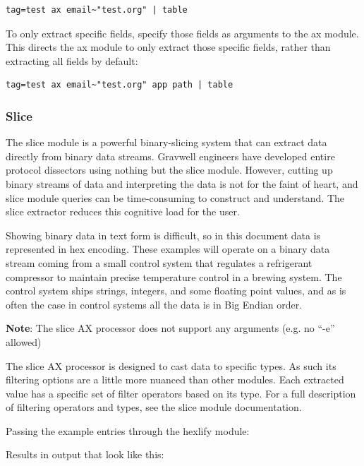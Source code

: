\begin{Verbatim}[breaklines=true]
tag=test ax email~"test.org" | table
\end{Verbatim}

To only extract specific fields, specify those fields as arguments to
the ax module. This directs the ax module to only extract those specific
fields, rather than extracting all fields by default:

\begin{Verbatim}[breaklines=true]
tag=test ax email~"test.org" app path | table
\end{Verbatim}

\subsubsection{Slice}

The slice module is a powerful binary-slicing system that can extract
data directly from binary data streams. Gravwell engineers have
developed entire protocol dissectors using nothing but the slice module.
However, cutting up binary streams of data and interpreting the data is
not for the faint of heart, and slice module queries can be
time-consuming to construct and understand. The slice extractor reduces
this cognitive load for the user.

Showing binary data in text form is difficult, so in this document data
is represented in hex encoding. These examples will operate on a binary
data stream coming from a small control system that regulates a
refrigerant compressor to maintain precise temperature control in a
brewing system. The control system ships strings, integers, and some
floating point values, and as is often the case in control systems all
the data is in Big Endian order.

\textbf{Note}: The slice AX processor does not support any arguments (e.g. no
``-e'' allowed)

The slice AX processor is designed to cast data to specific types. As
such its filtering options are a little more nuanced than other modules.
Each extracted value has a specific set of filter operators based on its
type. For a full description of filtering operators and types, see the
slice module documentation.

Passing the example entries through the hexlify module:


Results in output that look like this:


